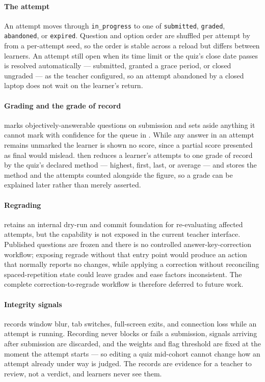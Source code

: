 \paragraph{The attempt}
An attempt moves through \texttt{in\_progress} to one of \texttt{submitted}, \texttt{graded}, \texttt{abandoned}, or \texttt{expired}. Question and option order are shuffled per attempt by  from a per-attempt seed, so the order is stable across a reload but differs between learners. An attempt still open when its time limit or the quiz's close date passes is resolved automatically --- submitted, granted a grace period, or closed ungraded --- as the teacher configured, so an attempt abandoned by a closed laptop does not wait on the learner's return.

\paragraph{Grading and the grade of record}
 marks objectively-answerable questions on submission and sets aside anything it cannot mark with confidence for the queue in . While any answer in an attempt remains unmarked the learner is shown no score, since a partial score presented as final would mislead.  then reduces a learner's attempts to one grade of record by the quiz's declared method --- highest, first, last, or average --- and stores the method and the attempts counted alongside the figure, so a grade can be explained later rather than merely asserted.

\paragraph{Regrading}
 retains an internal dry-run and commit foundation for re-evaluating affected attempts, but the capability is not exposed in the current teacher interface. Published questions are frozen and there is no controlled answer-key-correction workflow; exposing regrade without that entry point would produce an action that normally reports no changes, while applying a correction without reconciling spaced-repetition state could leave grades and ease factors inconsistent. The complete correction-to-regrade workflow is therefore deferred to future work.

\paragraph{Integrity signals}
 records window blur, tab switches, full-screen exits, and connection loss while an attempt is running. Recording never blocks or fails a submission, signals arriving after submission are discarded, and the weights and flag threshold are fixed at the moment the attempt starts --- so editing a quiz mid-cohort cannot change how an attempt already under way is judged. The records are evidence for a teacher to review, not a verdict, and learners never see them.


